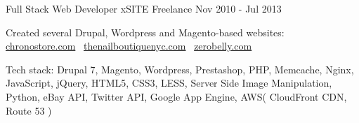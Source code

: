 \begin{cventries}
  \cventry
    {Full Stack Web Developer} %
    {xSITE} %
    {Freelance} %
    {Nov 2010 - Jul 2013} %
    {
      \begin{cvitems} %
        \item {Created several Drupal, Wordpress and Magento-based websites:\\
\color{awesome}\href{https://chronostore.com}{chronostore.com} \color{text}\guillemotright\, \color{awesome}\href{http://www.thenailboutiquenyc.com}{thenailboutiquenyc.com}  \color{text}\guillemotright\, \color{awesome}\href{http://www.zerobelly.com}{zerobelly.com}}
        \item {Tech stack: Drupal 7, Magento, Wordpress, Prestashop, PHP, Memcache, Nginx, JavaScript, jQuery, HTML5, CSS3, LESS, Server Side Image Manipulation, Python, eBay API, Twitter API, Google App Engine, AWS( CloudFront CDN, Route 53 )}
      \end{cvitems}
    }

\end{cventries}
